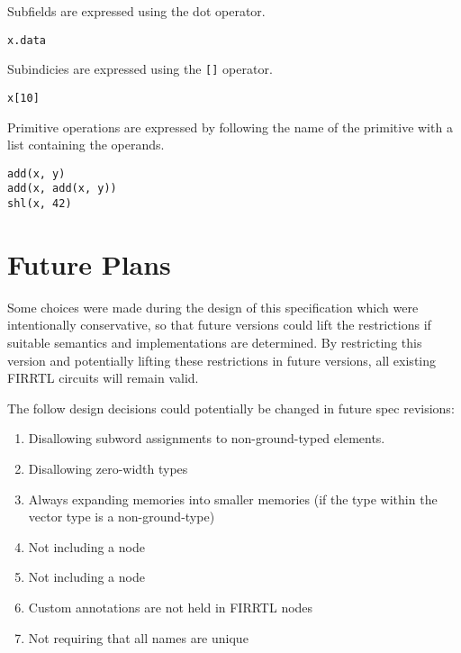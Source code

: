\documentclass[12pt]{article}
\begin{document}
Subfields are expressed using the dot operator.
\begin{verbatim}
x.data
\end{verbatim}

Subindicies are expressed using the \verb|[]| operator.
\begin{verbatim}
x[10]
\end{verbatim}

Primitive operations are expressed by following the name of the primitive with a list containing the operands. 
\begin{verbatim}
add(x, y)
add(x, add(x, y))
shl(x, 42)
\end{verbatim}

\section{Future Plans}
Some choices were made during the design of this specification which were intentionally conservative, so that future versions could lift the restrictions if suitable semantics and implementations are determined.
By restricting this version and potentially lifting these restrictions in future versions, all existing FIRRTL circuits will remain valid.

The follow design decisions could potentially be changed in future spec revisions:
\begin{enumerate}[topsep=3pt,itemsep=-0.5ex,partopsep=1ex,parsep=1ex]
\item Disallowing subword assignments to non-ground-typed elements.
\item Disallowing zero-width types
\item Always expanding memories into smaller memories (if the type within the vector type is a non-ground-type)
\item Not including a  node
\item Not including a  node
\item Custom annotations are not held in FIRRTL nodes
\item Not requiring that all names are unique
\end{enumerate}
\end{document}
